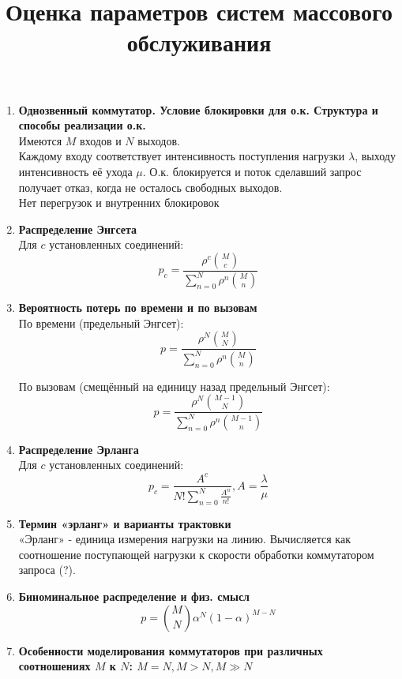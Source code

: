 \documentclass[12pt]{article}
\begin{document}
\title{Оценка параметров систем массового обслуживания}
\date{}
\maketitle

\begin{enumerate}

	\item \textbf{Однозвенный коммутатор. Условие блокировки для о.к. Структура и способы реализации о.к.} \\ 
	Имеются $M$ входов и $N$ выходов.\\
	Каждому входу соответствует интенсивность поступления нагрузки $\lambda$, выходу интенсивность её ухода $\mu$. 
	О.к. блокируется и поток сделавший запрос получает отказ, когда не осталось свободных выходов. \\
	Нет перегрузок и внутренних блокировок

	\item \textbf{Распределение Энгсета} \\
	Для $c$ установленных соединений:
	 \[
		 p_c = \frac{\rho ^ c \binom{M}{c}}
		 {\sum_{n=0}^{N} \rho ^ n \binom{M}{n}}
	 \]

	\item \textbf{Вероятность потерь по времени и по вызовам} \\
	По времени (предельный Энгсет):
	\[
 		p = \frac{\rho ^ N \binom{M}{N}}
 		{\sum_{n=0}^{N} \rho ^ n \binom{M}{n}}
	\]

	По вызовам (смещённый на единицу назад предельный Энгсет):
	\[
 		p = \frac{\rho ^ N \binom{M - 1}{N}}
 		{\sum_{n=0}^{N} \rho ^ n \binom{M - 1}{n}}
	\]

		
	\item \textbf{Распределение Эрланга} \\
	Для $c$ установленных соединений:
	\[
	 	p_c = \frac{A ^ c}
	 	{N!\sum_{n=0}^{N} \frac{A ^ n}{n!}}, A = \frac{\lambda}{\mu}
	\]

	\item \textbf{Термин «эрланг» и варианты трактовки } \\
	«Эрланг» - единица измерения нагрузки на линию. Вычисляется как соотношение поступающей нагрузки к скорости обработки коммутатором запроса (?).

	\item \textbf{Биноминальное распределение и физ. смысл}
		\[
		 	p = \binom{M}{N} \alpha ^ N (1 - \alpha) ^ {M - N}
		\]
	\item \textbf{Особенности моделирования коммутаторов при различных соотношениях $M$ к $N$: $M = N, M > N, M ≫ N$} \\
	

\end{enumerate}
\end{document}
